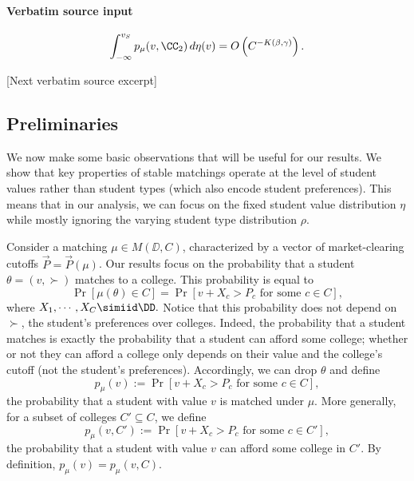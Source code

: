 \documentclass[10pt]{article}
\begin{document}
\paragraph{Verbatim source input}
\begin{ReviewVerbatim}
\begin{proposition}\label{prop:duck-2}
\begin{equation}
    \int_{-\infty}^{v_S} p_\mu(v, \CC_2)\,d\eta(v) = O\left(C^{-K(\beta,\gamma)}\right).
\end{equation}
\end{proposition}

[Next verbatim source excerpt]

\subsection{Preliminaries}
We now make some basic observations that will be useful for our results. We show that key properties of stable matchings operate at the level of student values rather than student types (which also encode student preferences). This means that in our analysis, we can focus on the fixed student value distribution $\eta$ while mostly ignoring the varying student type distribution $\rho$.

Consider a matching $\mu\in M(\DD, C)$, characterized by a vector of market-clearing cutoffs $\vec{P}=\vec{P}(\mu)$. Our results focus on the probability that a student $\theta=(v,\succ)$ matches to a college. This probability is equal to
\begin{equation}
    \Pr[\mu(\theta)\in C] = \Pr[v + X_c > P_c\text{ for some $c\in C$}],
\end{equation}
where $X_1, \cdots, X_C \simiid \DD.$ Notice that this probability does not depend on $\succ$, the student's preferences over colleges. Indeed, the probability that a student matches is exactly the probability that a student can afford some college; whether or not they can afford a college only depends on their value and the college's cutoff (not the student's preferences). Accordingly, we can drop $\theta$ and define
\begin{equation}
    p_\mu(v) := \Pr[v + X_c > P_c\text{ for some $c\in C$}],
\end{equation}
the probability that a student with value $v$ is matched under $\mu$. More generally, for a subset of colleges $C'\subseteq C$, we define
\begin{equation}
    p_\mu(v, C') := \Pr[v + X_c > P_c\text{ for some $c\in C'$}],
\end{equation}
the probability that a student with value $v$ can afford some college in $C'$. By definition, $p_\mu(v) = p_\mu(v, C).$


\end{ReviewVerbatim}
\end{document}
